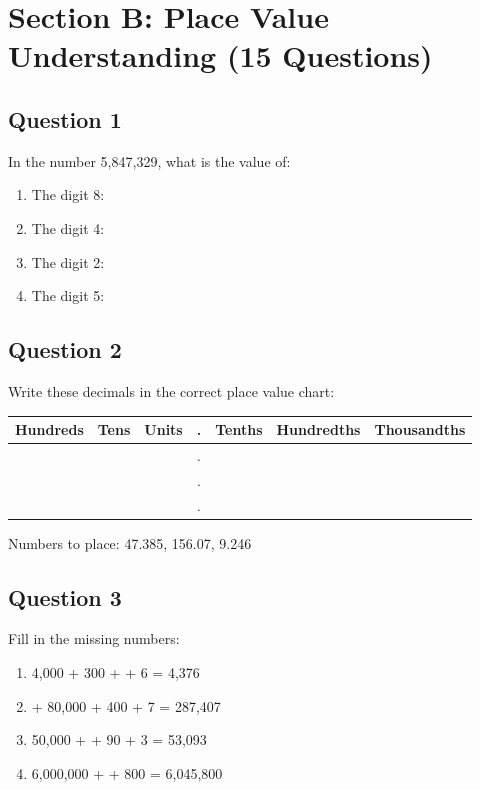 \documentclass{article}
\begin{document}
\section{Section B: Place Value Understanding (15 Questions)}

\subsection*{Question 1}
In the number 5,847,329, what is the value of:
\begin{enumerate}
    \item The digit 8: \underline{\hspace{3cm}}
    \item The digit 4: \underline{\hspace{3cm}}
    \item The digit 2: \underline{\hspace{3cm}}
    \item The digit 5: \underline{\hspace{3cm}}
\end{enumerate}

\subsection*{Question 2}
Write these decimals in the correct place value chart:

\begin{center}
\begin{tabular}{|c|c|c|c|c|c|c|}
\hline
\textbf{Hundreds} & \textbf{Tens} & \textbf{Units} & \textbf{.} & \textbf{Tenths} & \textbf{Hundredths} & \textbf{Thousandths} \\
\hline
 & & & . & & & \\
\hline
 & & & . & & & \\
\hline
 & & & . & & & \\
\hline
\end{tabular}
\end{center}

Numbers to place: 47.385, 156.07, 9.246

\subsection*{Question 3}
Fill in the missing numbers:
\begin{enumerate}
    \item 4,000 + 300 + \underline{\hspace{1cm}} + 6 = 4,376
    \item \underline{\hspace{1cm}} + 80,000 + 400 + 7 = 287,407
    \item 50,000 + \underline{\hspace{1cm}} + 90 + 3 = 53,093
    \item 6,000,000 + \underline{\hspace{1cm}} + 800 = 6,045,800
\end{enumerate}
\end{document}
